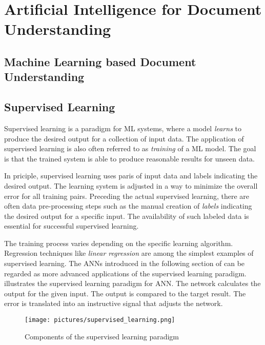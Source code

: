 \section{Artificial Intelligence for Document Understanding}
\subsection{Machine Learning based Document Understanding}

\subsection{Supervised Learning}
\label{supervised}
Supervised learning is a paradigm for \ac{ML} systems, where a model \textit{learns} to produce the desired output for a collection of input data. The application of supervised learning is also often referred to as \textit{training} of a \ac{ML} model. The goal is that the trained system is able to produce reasonable results for unseen data.
\cite{haykin2009neural,knudsen1994supervised}

In priciple, supervised learning uses paris of input data and labels indicating the desired output. The learning system is adjusted in a way to minimize the overall error for all training pairs.
Preceding the actual supervised learning, there are often data pre-processing steps such as the manual creation of \textit{labels} indicating the desired output for a specific input. The availability of such labeled data is essential for successful supervised learning.
\cite{haykin2009neural}

The training process varies depending on the specific learning algorithm.
Regression techniques like \textit{linear regression} are among the simplest examples of supervised learning. The \acp{ANN} introduced in the following section of can be regarded as more advanced applications of the supervised learning paradigm. 
 illustrates the supervised learning paradigm for \ac{ANN}. The network calculates the output for the given input. The output is compared to the target result. The error is translated into an instructive signal that adjusts the network. 
\cite{haykin2009neural,knudsen1994supervised}

\begin{figure}[ht]
    \centering 
    \texttt{[image: pictures/supervised\_learning.png]}
    \caption{Components of the supervised learning paradigm \cite{knudsen1994supervised}}
    \label{pic:supervised}    %
\end{figure}

